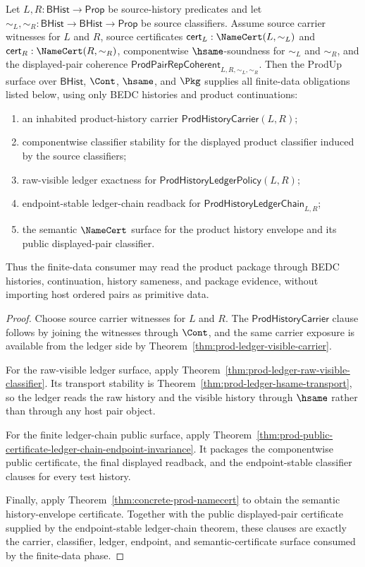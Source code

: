 \begin{theorem}
\label{thm:produp-obligation-surface-package}
Let $L,R:\mathsf{BHist}\to\mathsf{Prop}$ be source-history predicates and let
$\sim_L,\sim_R:\mathsf{BHist}\to\mathsf{BHist}\to\mathsf{Prop}$ be source
classifiers. Assume source carrier witnesses for $L$ and $R$, source certificates
$\mathsf{cert}_L:\NameCert(L,\sim_L)$ and
$\mathsf{cert}_R:\NameCert(R,\sim_R)$, componentwise $\hsame$-soundness for
$\sim_L$ and $\sim_R$, and the displayed-pair coherence
$\mathsf{ProdPairRepCoherent}_{L,R,\sim_L,\sim_R}$. Then the ProdUp surface
over $\mathsf{BHist}$, $\Cont$, $\hsame$, and $\Pkg$ supplies all finite-data
obligations listed below, using only BEDC histories and product continuations:
\begin{enumerate}
  \item an inhabited product-history carrier
  $\mathsf{ProdHistoryCarrier}(L,R)$;
  \item componentwise classifier stability for the displayed product
  classifier induced by the source classifiers;
  \item raw-visible ledger exactness for
  $\mathsf{ProdHistoryLedgerPolicy}(L,R)$;
  \item endpoint-stable ledger-chain readback for
  $\mathsf{ProdHistoryLedgerChain}_{L,R}$;
  \item the semantic $\NameCert$ surface for the product history envelope and
  its public displayed-pair classifier.
\end{enumerate}
Thus the finite-data consumer may read the product package through BEDC
histories, continuation, history sameness, and package evidence, without
importing host ordered pairs as primitive data.
\end{theorem}
\begin{proof}
Choose source carrier witnesses for $L$ and $R$. The
$\mathsf{ProdHistoryCarrier}$ clause follows by joining the witnesses through
$\Cont$, and the same carrier exposure is available from the ledger side by
Theorem~\ref{thm:prod-ledger-visible-carrier}.

For the raw-visible ledger surface, apply
Theorem~\ref{thm:prod-ledger-raw-visible-classifier}. Its transport stability is
Theorem~\ref{thm:prod-ledger-hsame-transport}, so the ledger reads the raw
history and the visible history through $\hsame$ rather than through any host
pair object.

For the finite ledger-chain public surface, apply
Theorem~\ref{thm:prod-public-certificate-ledger-chain-endpoint-invariance}. It
packages the componentwise public certificate, the final displayed readback, and
the endpoint-stable classifier clauses for every test history.

Finally, apply Theorem~\ref{thm:concrete-prod-namecert} to obtain the semantic
history-envelope certificate. Together with the public displayed-pair
certificate supplied by the endpoint-stable ledger-chain theorem, these clauses
are exactly the carrier, classifier, ledger, endpoint, and semantic-certificate
surface consumed by the finite-data phase.
\end{proof}

